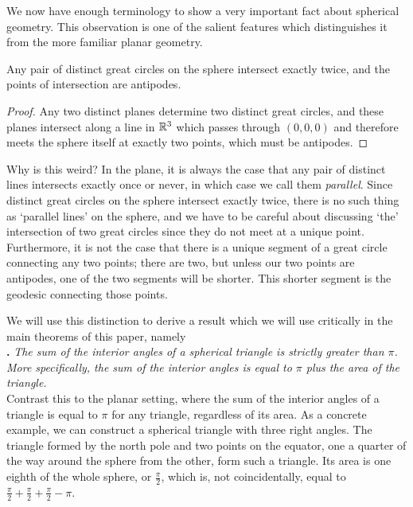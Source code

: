 We now have enough terminology to show a very important fact about spherical geometry.  This  observation is one of the salient features which distinguishes it from the more familiar planar geometry.


\begin{claim}
	Any pair of distinct great circles on the sphere intersect exactly twice, and the points of intersection are antipodes.
\end{claim}
\begin{proof}
	Any two distinct planes determine two distinct great circles, and these planes intersect along a line in $\mathbb{R}^3$ which passes through $(0,0,0)$ and therefore meets the sphere itself at exactly two points, which must be antipodes.
\end{proof}




Why is this weird? In the plane, it is always the case that any pair of distinct lines intersects exactly once or never, in which case we call them \textit{parallel}. Since distinct great circles on the sphere intersect exactly twice, there is no such thing as `parallel lines' on the sphere, and we have to be careful about discussing `the' intersection of two great circles since they do not meet at a unique point.  Furthermore, it is not the case that there is a unique segment of a great circle connecting any two points; there are two, but unless our two points are antipodes, one of the two segments will be shorter.  This shorter segment is the geodesic connecting those points.



We will use this distinction to derive a result which we will use critically in the main theorems of this paper, namely\\

\noindent\textbf{.}
\emph{The sum of the interior angles of a spherical triangle is strictly greater than $\pi$.  More specifically, the sum of the interior angles is equal to $\pi$ plus the area of the triangle.}\\

Contrast this to the planar setting, where the sum of the interior angles of a triangle is equal to $\pi$ for any triangle, regardless of its area.  As a concrete example, we can construct a spherical triangle with three right angles.  The triangle formed by the north pole and two points on the equator, one a quarter of the way around the sphere from the other, form such a triangle.  Its area is one eighth of the whole sphere, or $\tfrac{\pi}{2}$, which is, not coincidentally, equal to $\tfrac{\pi}{2}+\tfrac{\pi}{2}+\tfrac{\pi}{2} - \pi$.


